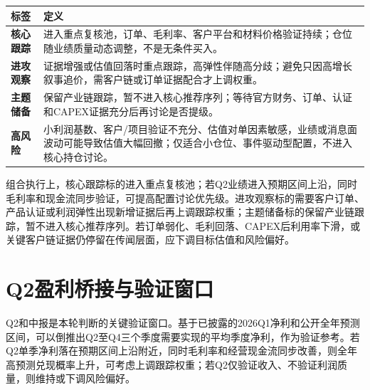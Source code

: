 \begin{dashboardbox}[动作与风险标签定义]
\small
\begin{tabularx}{\textwidth}{L{2.8cm}X}
\toprule
\textbf{标签} & \textbf{定义} \\
\midrule
\textbf{核心跟踪} & 进入重点复核池，订单、毛利率、客户平台和材料价格验证持续；仓位随业绩质量动态调整，不是无条件买入。 \\
\textbf{进攻观察} & 证据增强或估值回落时重点跟踪，高弹性伴随高分歧；避免只因高增长叙事追价，需客户链或订单证据配合才上调权重。 \\
\textbf{主题储备} & 保留产业链跟踪，暂不进入核心推荐序列；等待官方财务、订单、认证和CAPEX证据充分后再讨论是否提级。 \\
\textbf{高风险} & 小利润基数、客户/项目验证不充分、估值对单因素敏感，业绩或消息面波动可能导致估值大幅回撤；仅适合小仓位、事件驱动型配置，不进入核心持仓讨论。 \\
\bottomrule
\end{tabularx}
\end{dashboardbox}

组合执行上，核心跟踪标的进入重点复核池；若Q2业绩进入预期区间上沿，同时毛利率和现金流同步验证，可提高配置讨论优先级。进攻观察标的需要客户订单、产品认证或利润弹性出现新增证据后再上调跟踪权重；主题储备标的保留产业链跟踪，暂不进入核心推荐序列。若订单弱化、毛利回落、CAPEX后利用率下滑，或关键客户链证据仍停留在传闻层面，应下调目标估值和风险偏好。

\section{Q2盈利桥接与验证窗口}

Q2和中报是本轮判断的关键验证窗口。基于已披露的2026Q1净利和公开全年预测区间，可以倒推出Q2至Q4三个季度需要实现的平均季度净利，作为验证参考。若Q2单季净利落在预期区间上沿附近，同时毛利率和经营现金流同步改善，则全年高预测兑现概率上升，可考虑上调跟踪权重；若Q2仅验证收入、不验证利润质量，则维持或下调风险偏好。


